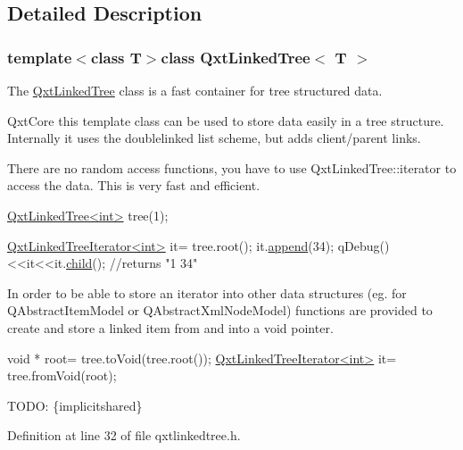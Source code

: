 \subsection{Detailed Description}
\subsubsection*{template$<$class T$>$class Qxt\-Linked\-Tree$<$ T $>$}

The \hyperlink{class_qxt_linked_tree}{Qxt\-Linked\-Tree} class is a fast container for tree structured data. 

Qxt\-Core this template class can be used to store data easily in a tree structure. Internally it uses the doublelinked list scheme, but adds client/parent links.

There are no random access functions, you have to use Qxt\-Linked\-Tree\-::iterator to access the data. This is very fast and efficient.


\begin{DoxyCode}
\hyperlink{class_qxt_linked_tree}{QxtLinkedTree<int>} tree(1);

\hyperlink{class_qxt_linked_tree_iterator}{QxtLinkedTreeIterator<int>} it= tree.root();
it.\hyperlink{class_qxt_linked_tree_iterator_a22a373e968f0d2d8d6c9632a8760ddea}{append}(34);
qDebug()<<it<<it.\hyperlink{class_qxt_linked_tree_iterator_affa0700ff1b86d2db1edf8fa74514022}{child}(); \textcolor{comment}{//returns "1 34"}
\end{DoxyCode}


In order to be able to store an iterator into other data structures (eg. for Q\-Abstract\-Item\-Model or Q\-Abstract\-Xml\-Node\-Model) functions are provided to create and store a linked item from and into a void pointer.


\begin{DoxyCode}
\textcolor{keywordtype}{void} * root= tree.toVoid(tree.root());
\hyperlink{class_qxt_linked_tree_iterator}{QxtLinkedTreeIterator<int>} it= tree.fromVoid(root);
\end{DoxyCode}


T\-O\-D\-O\-: \{implicitshared\} 

Definition at line 32 of file qxtlinkedtree.\-h.



